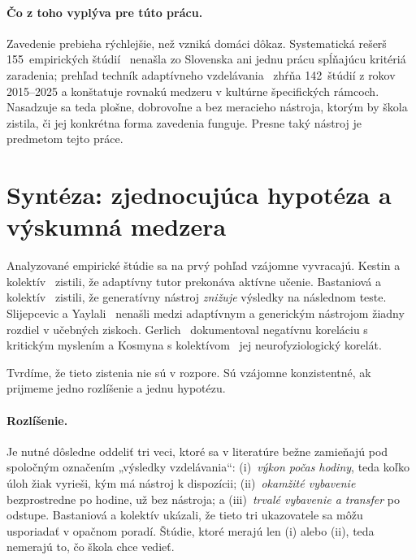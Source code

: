 \paragraph{Čo z toho vyplýva pre túto prácu.} Zavedenie prebieha rýchlejšie, než vzniká domáci dôkaz. Systematická rešerš 155~empirických štúdií~\cite{garzon2025systematic} nenašla zo Slovenska ani jednu prácu spĺňajúcu kritériá zaradenia; prehľad techník adaptívneho vzdelávania~\cite{hariyanto2025adaptive} zhŕňa 142~štúdií z rokov 2015--2025 a konštatuje rovnakú medzeru v kultúrne špecifických rámcoch. Nasadzuje sa teda plošne, dobrovoľne a bez meracieho nástroja, ktorým by škola zistila, či jej konkrétna forma zavedenia funguje. Presne taký nástroj je predmetom tejto práce.


\section{Syntéza: zjednocujúca hypotéza a výskumná medzera}
\label{sec:syntezahypotezy}

Analyzované empirické štúdie sa na prvý pohľad vzájomne vyvracajú. Kestin a kolektív~\cite{kestin2025aitutoring} zistili, že adaptívny tutor prekonáva aktívne učenie. Bastaniová a kolektív~\cite{bastani2025harm} zistili, že generatívny nástroj \emph{znižuje} výsledky na následnom teste. Slijepcevic a Yaylali~\cite{slijepcevic2025khanmigo} nenašli medzi adaptívnym a generickým nástrojom žiadny rozdiel v učebných ziskoch. Gerlich~\cite{gerlich2025offloading} dokumentoval negatívnu koreláciu s kritickým myslením a Kosmyna s kolektívom~\cite{kosmyna2025brain} jej neurofyziologický korelát.

Tvrdíme, že tieto zistenia nie sú v rozpore. Sú vzájomne konzistentné, ak prijmeme jedno rozlíšenie a jednu hypotézu.

\paragraph{Rozlíšenie.} Je nutné dôsledne oddeliť tri veci, ktoré sa v literatúre bežne zamieňajú pod spoločným označením „výsledky vzdelávania“: (i)~\emph{výkon počas hodiny}, teda koľko úloh žiak vyrieši, kým má nástroj k dispozícii; (ii)~\emph{okamžité vybavenie} bezprostredne po hodine, už bez nástroja; a (iii)~\emph{trvalé vybavenie a transfer} po odstupe. Bastaniová a kolektív ukázali, že tieto tri ukazovatele sa môžu usporiadať v opačnom poradí. Štúdie, ktoré merajú len (i) alebo (ii), teda nemerajú to, čo škola chce vedieť.

